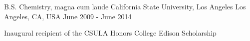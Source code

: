 

\begin{cventries}

  \cventry
    {B.S. Chemistry, magna cum laude} %
    {California State University, Los Angeles} %
    {Los Angeles, CA, USA} %
    {June 2009 - June 2014} %
    {
      \begin{cvitems} %
        \item {Inaugural recipient of the CSULA Honors College Edison Scholarship}
      \end{cvitems}
    }

\end{cventries}
